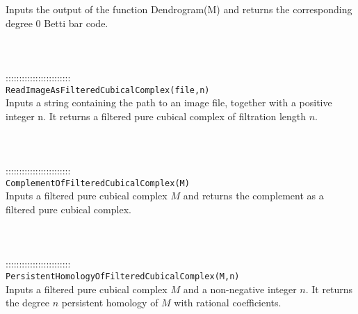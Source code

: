 \documentclass[a4paper,11pt]{report}
\begin{document}
{ Inputs the output of the function Dendrogram(M) and returns the corresponding
degree 0 Betti bar code. \\
 \\
 \\
 \\
 ::::::::::::::::::::::::\\
 \texttt{ReadImageAsFilteredCubicalComplex(file,n)}\\
 

 Inputs a string containing the path to an image file, together with a positive
integer n. It returns a filtered pure cubical complex of filtration length $n$. \\
 \\
 \\
 \\
 ::::::::::::::::::::::::\\
 \texttt{ComplementOfFilteredCubicalComplex(M)}\\
 

 Inputs a filtered pure cubical complex $M$ and returns the complement as a filtered pure cubical complex. \\
 \\
 \\
 \\
 ::::::::::::::::::::::::\\
 \texttt{PersistentHomologyOfFilteredCubicalComplex(M,n)}\\
 

 Inputs a filtered pure cubical complex $M$ and a non-negative integer $n$. It returns the degree $n$ persistent homology of $ M$ with rational coefficients. \\
 \\
 \\
 }

 
\end{document}
